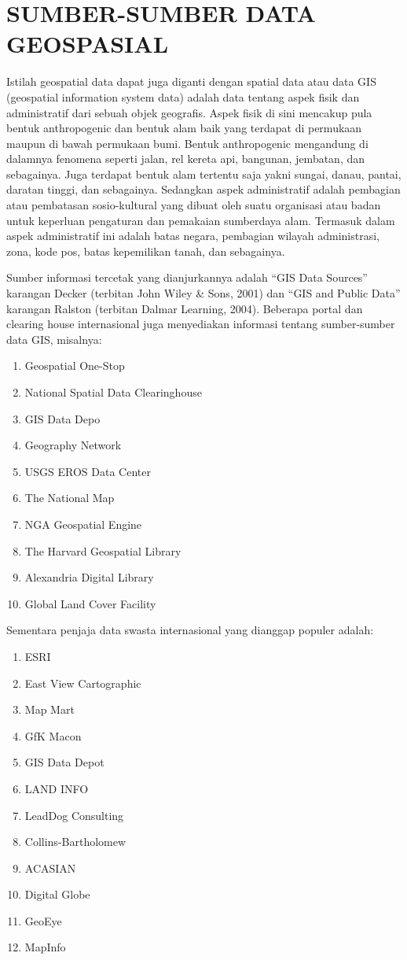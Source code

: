 \section{SUMBER-SUMBER DATA GEOSPASIAL}

Istilah geospatial data dapat juga diganti dengan spatial data atau data GIS (geospatial information system data) adalah data tentang aspek fisik dan administratif dari sebuah objek geografis. Aspek fisik di sini mencakup pula bentuk anthropogenic dan bentuk alam baik yang terdapat di permukaan maupun di bawah permukaan bumi. Bentuk anthropogenic mengandung di dalamnya fenomena seperti jalan, rel kereta api, bangunan, jembatan, dan sebagainya. Juga terdapat bentuk alam tertentu saja yakni sungai, danau, pantai, daratan tinggi, dan sebagainya. Sedangkan aspek administratif adalah pembagian atau pembatasan sosio-kultural yang dibuat oleh suatu organisasi atau badan untuk keperluan pengaturan dan pemakaian sumberdaya alam. Termasuk dalam aspek administratif ini adalah batas negara, pembagian wilayah administrasi, zona, kode pos, batas kepemilikan tanah, dan sebagainya. 

Sumber informasi tercetak yang dianjurkannya adalah “GIS Data Sources” karangan Decker (terbitan John Wiley \& Sons, 2001) dan “GIS and Public Data” karangan Ralston (terbitan Dalmar Learning, 2004). Beberapa portal dan clearing house internasional juga menyediakan informasi tentang sumber-sumber data GIS, misalnya:
\begin{enumerate}
\item Geospatial One-Stop
\item National Spatial Data Clearinghouse
\item GIS Data Depo
\item Geography Network
\item USGS EROS Data Center
\item The National Map
\item NGA Geospatial Engine
\item The Harvard Geospatial Library
\item Alexandria Digital Library
\item Global Land Cover Facility
\end{enumerate}

Sementara penjaja data swasta internasional yang dianggap populer adalah:
\begin{enumerate}
\item ESRI
\item East View Cartographic
\item Map Mart
\item GfK Macon
\item GIS Data Depot
\item LAND INFO
\item LeadDog Consulting
\item Collins-Bartholomew
\item ACASIAN
\item Digital Globe
\item GeoEye
\item MapInfo
\end{enumerate}

